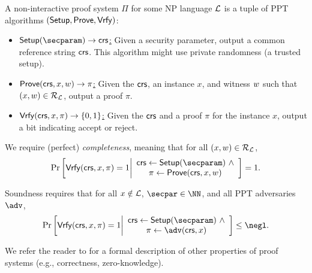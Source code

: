 \begin{definition} A non-interactive proof system $\Pi$ for some NP language $\mathcal{L}$ is a tuple of PPT algorithms $(\mathsf{Setup}, \mathsf{Prove}, \mathsf{Vrfy})$:
    \begin{itemize}
        \item \underline{$\setup(\secparam) \rightarrow \crs$:} Given a security parameter, output a common reference string $\mathsf{crs}$. This algorithm might use private randomness (a trusted setup).
        \item \underline{$\mathsf{Prove}(\mathsf{crs}, x, w) \rightarrow \pi$:} Given the $\mathsf{crs}$, an instance $x$, and witness $w$ such that $(x, w) \in \mathcal{R}_{\mathcal{L}}$, output a proof $\pi$.
        \item \underline{$\mathsf{Vrfy}(\mathsf{crs}, x,\pi) \rightarrow \{0,1\}$:} Given the $\mathsf{crs}$ and a proof $\pi$ for the instance $x$, output a bit indicating accept or reject.
    \end{itemize}

We require (perfect) \emph{completeness}, meaning that for all $(x,w) \in \mathcal{R}_{\mathcal{L}}$,
\begin{equation*}
    \Pr\left[
        \vrfy(\crs, x, \pi)=1 
        \middle| 
        \begin{array}{c}
            \crs \gets \setup(\secparam)~\land\\
            \pi \gets \prove(\crs, x, \witness)
        \end{array}
    \right] = 1.
\end{equation*}
\end{definition}

\begin{definition} Soundness requires that for all $x \notin \mathcal{L}$, $\secpar \in \NN$, and all PPT adversaries $\adv$,
\begin{equation*}
    \Pr\left[
        \vrfy(\crs, x, \pi)=1 
        \middle| 
        \begin{array}{c}
            \crs \gets \setup(\secparam)~\land\\
            \pi \gets \adv(\crs, x)
        \end{array}
    \right] \leq \negl.
\end{equation*}
\end{definition}

We refer the reader to \cite{Thaler23,GoldreichFoC} for a formal description of other properties of proof systems (e.g., correctness, zero-knowledge). 

